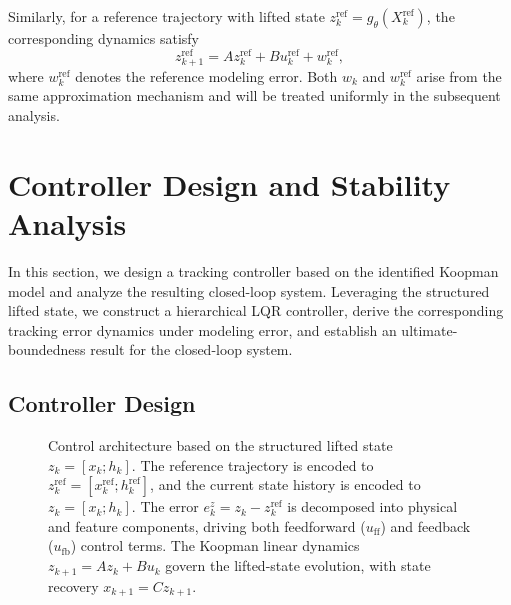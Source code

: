 \documentclass[journal]{IEEEtran}
\begin{document}
Similarly, for a reference trajectory with lifted state $z_k^{\mathrm{ref}} = g_\theta(X_k^{\mathrm{ref}})$, the corresponding dynamics satisfy
\begin{equation}
    z_{k+1}^{\mathrm{ref}} = A z_k^{\mathrm{ref}} + B u_k^{\mathrm{ref}} + w_k^{\mathrm{ref}},
    \label{eq:ref_error}
\end{equation}
where $w_k^{\mathrm{ref}}$ denotes the reference modeling error. Both $w_k$ and $w_k^{\mathrm{ref}}$ arise from the same approximation mechanism and will be treated uniformly in the subsequent analysis.

\section{Controller Design and Stability Analysis}
\label{sec:control}

In this section, we design a tracking controller based on the identified Koopman model and analyze the resulting closed-loop system. Leveraging the structured lifted state, we construct a hierarchical LQR controller, derive the corresponding tracking error dynamics under modeling error, and establish an ultimate-boundedness result for the closed-loop system.

\subsection{Controller Design}
\label{subsec:controller_design}

\begin{figure}[!t]
    \centering
    \caption{Control architecture based on the structured lifted state $z_k=[x_k;h_k]$. The reference trajectory is encoded to $z_k^{\mathrm{ref}}=[x_k^{\mathrm{ref}};h_k^{\mathrm{ref}}]$, and the current state history is encoded to $z_k=[x_k;h_k]$. The error $e_k^z = z_k - z_k^{\mathrm{ref}}$ is decomposed into physical and feature components, driving both feedforward ($u_{\mathrm{ff}}$) and feedback ($u_{\mathrm{fb}}$) control terms. The Koopman linear dynamics $z_{k+1}=Az_k+Bu_k$ govern the lifted-state evolution, with state recovery $x_{k+1}=Cz_{k+1}$.}
    \label{fig:control_architecture}
\end{figure}
\end{document}
